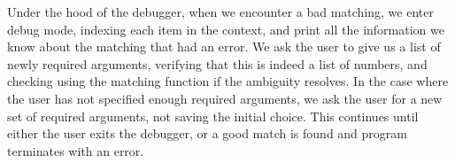 \documentclass[11pt]{article}
\begin{document}
Under the hood of the debugger, when we encounter a bad matching,
we enter debug mode, indexing each item in the context,
and print all the information we know about the matching that had an error.
We ask the user to give us a list of newly required arguments,
verifying that this is indeed a list of numbers,
and checking using the matching function if the ambiguity resolves.
In the case where the user has not specified enough required arguments,
we ask the user for a new set of required arguments,
not saving the initial choice.
This continues until either the user exits the debugger,
or a good match is found and program terminates with an error.
\end{document}
